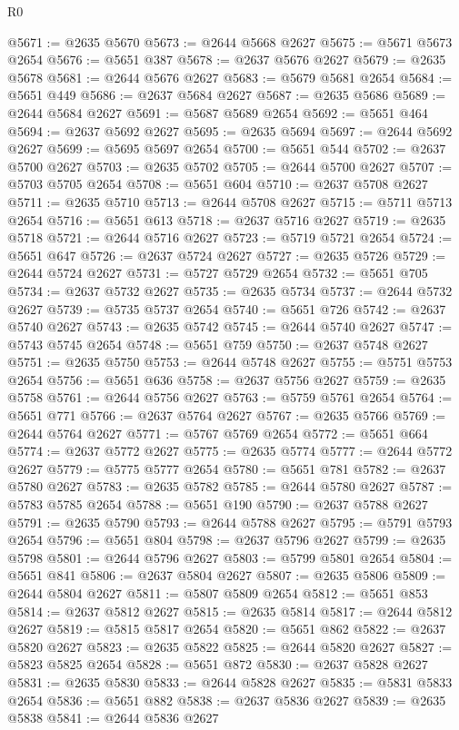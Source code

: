 \begin{lexlean}{R0}
\begin{coremodule}
@5671 := @2635 @5670
@5673 := @2644 @5668 @2627
@5675 := @5671 @5673 @2654
@5676 := @5651 @387
@5678 := @2637 @5676 @2627
@5679 := @2635 @5678
@5681 := @2644 @5676 @2627
@5683 := @5679 @5681 @2654
@5684 := @5651 @449
@5686 := @2637 @5684 @2627
@5687 := @2635 @5686
@5689 := @2644 @5684 @2627
@5691 := @5687 @5689 @2654
@5692 := @5651 @464
@5694 := @2637 @5692 @2627
@5695 := @2635 @5694
@5697 := @2644 @5692 @2627
@5699 := @5695 @5697 @2654
@5700 := @5651 @544
@5702 := @2637 @5700 @2627
@5703 := @2635 @5702
@5705 := @2644 @5700 @2627
@5707 := @5703 @5705 @2654
@5708 := @5651 @604
@5710 := @2637 @5708 @2627
@5711 := @2635 @5710
@5713 := @2644 @5708 @2627
@5715 := @5711 @5713 @2654
@5716 := @5651 @613
@5718 := @2637 @5716 @2627
@5719 := @2635 @5718
@5721 := @2644 @5716 @2627
@5723 := @5719 @5721 @2654
@5724 := @5651 @647
@5726 := @2637 @5724 @2627
@5727 := @2635 @5726
@5729 := @2644 @5724 @2627
@5731 := @5727 @5729 @2654
@5732 := @5651 @705
@5734 := @2637 @5732 @2627
@5735 := @2635 @5734
@5737 := @2644 @5732 @2627
@5739 := @5735 @5737 @2654
@5740 := @5651 @726
@5742 := @2637 @5740 @2627
@5743 := @2635 @5742
@5745 := @2644 @5740 @2627
@5747 := @5743 @5745 @2654
@5748 := @5651 @759
@5750 := @2637 @5748 @2627
@5751 := @2635 @5750
@5753 := @2644 @5748 @2627
@5755 := @5751 @5753 @2654
@5756 := @5651 @636
@5758 := @2637 @5756 @2627
@5759 := @2635 @5758
@5761 := @2644 @5756 @2627
@5763 := @5759 @5761 @2654
@5764 := @5651 @771
@5766 := @2637 @5764 @2627
@5767 := @2635 @5766
@5769 := @2644 @5764 @2627
@5771 := @5767 @5769 @2654
@5772 := @5651 @664
@5774 := @2637 @5772 @2627
@5775 := @2635 @5774
@5777 := @2644 @5772 @2627
@5779 := @5775 @5777 @2654
@5780 := @5651 @781
@5782 := @2637 @5780 @2627
@5783 := @2635 @5782
@5785 := @2644 @5780 @2627
@5787 := @5783 @5785 @2654
@5788 := @5651 @190
@5790 := @2637 @5788 @2627
@5791 := @2635 @5790
@5793 := @2644 @5788 @2627
@5795 := @5791 @5793 @2654
@5796 := @5651 @804
@5798 := @2637 @5796 @2627
@5799 := @2635 @5798
@5801 := @2644 @5796 @2627
@5803 := @5799 @5801 @2654
@5804 := @5651 @841
@5806 := @2637 @5804 @2627
@5807 := @2635 @5806
@5809 := @2644 @5804 @2627
@5811 := @5807 @5809 @2654
@5812 := @5651 @853
@5814 := @2637 @5812 @2627
@5815 := @2635 @5814
@5817 := @2644 @5812 @2627
@5819 := @5815 @5817 @2654
@5820 := @5651 @862
@5822 := @2637 @5820 @2627
@5823 := @2635 @5822
@5825 := @2644 @5820 @2627
@5827 := @5823 @5825 @2654
@5828 := @5651 @872
@5830 := @2637 @5828 @2627
@5831 := @2635 @5830
@5833 := @2644 @5828 @2627
@5835 := @5831 @5833 @2654
@5836 := @5651 @882
@5838 := @2637 @5836 @2627
@5839 := @2635 @5838
@5841 := @2644 @5836 @2627

\end{coremodule}
\end{lexlean}
